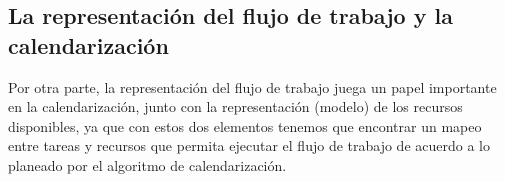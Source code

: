 \documentclass[letterpaper, 12pt]{report}
\begin{document}
\subsection*{La representación del flujo de trabajo y la calendarización}

Por otra parte, la representación del flujo de trabajo juega un papel importante en la calendarización, junto con la representación (modelo) de los recursos disponibles, ya que con estos dos elementos tenemos que encontrar un mapeo entre tareas y recursos que permita ejecutar el flujo de trabajo de acuerdo a lo planeado por el algoritmo de calendarización.

\end{document}
